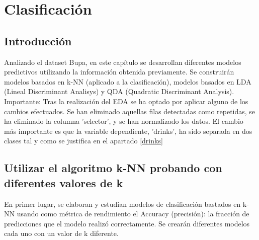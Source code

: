 \chapter{Clasificación}

\section{Introducción}
Analizado el dataset Bupa, en este capítulo se desarrollan diferentes modelos predictivos utilizando la información obtenida previamente.
Se construirán modelos basados en k-NN (aplicado a la clasificación), modelos basados en LDA (Lineal Discriminant Analisys) y QDA (Quadratic Discriminant Analysis).\\


Importante: Tras la realización del EDA se ha optado por aplicar alguno de los cambios efectuados. Se han eliminado aquellas filas detectadas como repetidas, se ha eliminado la columna 'selector', y se han normalizado los datos.
El cambio más importante es que la variable dependiente, 'drinks', ha sido separada en dos clases tal y como se justifica en el apartado \ref{drinks}





\section{Utilizar el algoritmo k-NN probando con diferentes valores de k}
En primer lugar, se elaboran y estudian modelos de clasificación bastados en k-NN usando como métrica de rendimiento el Accuracy (precisión): la fracción de predicciones que el modelo realizó correctamente.
Se crearán diferentes modelos cada uno con un valor de k diferente.

